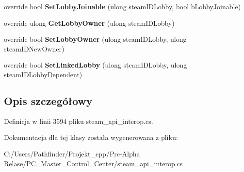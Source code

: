 \begin{DoxyCompactItemize}
override bool {\bfseries Set\+Lobby\+Joinable} (ulong steam\+I\+D\+Lobby, bool b\+Lobby\+Joinable)
\item 
\mbox{\label{class_valve_1_1_steamworks_1_1_c_steam_matchmaking_aa6a49fbb6496d8444872a66dc0160594}} 
override ulong {\bfseries Get\+Lobby\+Owner} (ulong steam\+I\+D\+Lobby)
\item 
\mbox{\label{class_valve_1_1_steamworks_1_1_c_steam_matchmaking_a84a77c1e5d87884a233999aad245ace8}} 
override bool {\bfseries Set\+Lobby\+Owner} (ulong steam\+I\+D\+Lobby, ulong steam\+I\+D\+New\+Owner)
\item 
\mbox{\label{class_valve_1_1_steamworks_1_1_c_steam_matchmaking_a7281b21d17288a03d3f694b7e96bc745}} 
override bool {\bfseries Set\+Linked\+Lobby} (ulong steam\+I\+D\+Lobby, ulong steam\+I\+D\+Lobby\+Dependent)
\end{DoxyCompactItemize}


\subsection{Opis szczegółowy}


Definicja w linii 3594 pliku steam\+\_\+api\+\_\+interop.\+cs.



Dokumentacja dla tej klasy została wygenerowana z pliku\+:\begin{DoxyCompactItemize}
\item 
C\+:/\+Users/\+Pathfinder/\+Projekt\+\_\+cpp/\+Pre-\/\+Alpha Relase/\+P\+C\+\_\+\+Master\+\_\+\+Control\+\_\+\+Center/steam\+\_\+api\+\_\+interop.\+cs\end{DoxyCompactItemize}
